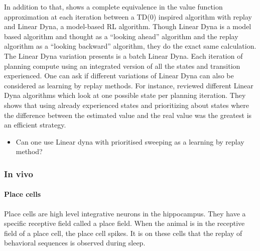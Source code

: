 \documentclass[]{article}
\begin{document}
In addition to that, \textcite{vanseijen_deeper_2015} shows a complete equivalence in the value function approximation at each iteration between a TD(0) inspired algorithm with replay and Linear Dyna, a model-based RL algorithm. Though Linear Dyna is a model based algorithm and thought as a ``looking ahead'' algorithm and the replay algorithm as a ``looking backward'' algorithm, they do the exact same calculation.
The Linear Dyna variation \textcite{vanseijen_deeper_2015} presents is a batch Linear Dyna. Each iteration of planning compute using an integrated version of all the states and transition experienced. One can ask if different variations of Linear Dyna can also be considered as learning by replay methods. For instance, \textcite{sutton_dyna-style_2012} reviewed different Linear Dyna algorithms which look at one possible state per planning iteration. They shows that using already experienced states and prioritizing about states where the difference between the estimated value and the real value was the greatest is an efficient strategy.


\begin{itemize}
\item
  Can one use Linear dyna with prioritised sweeping as a learning by replay method?
\end{itemize}

\subsubsection{In vivo}
\label{sub:In vivo}

\paragraph{Place cells}\label{place-cells}
Place cells are high level integrative neurons in the hippocampus. They have a specific receptive field called a place field. When the animal is in the receptive field of a place cell, the place cell spikes. It is on these cells that the replay of behavioral sequences is observed during sleep.
\end{document}
